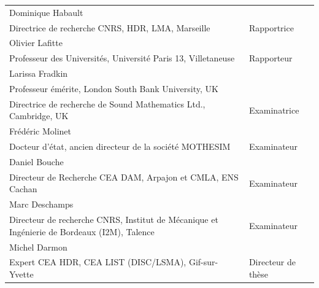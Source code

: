 \documentclass[a4paper]{article}
\newcommand{\jurynameA}{Dominique Habault}
\newcommand{\juryadressA}{Directrice de recherche CNRS, HDR, LMA, Marseille}
\newcommand{\juryroleA}{Rapportrice}
\newcommand{\jurynameB}{Olivier Lafitte}
\newcommand{\juryadressB}{Professeur des Universités, Université Paris 13, Villetaneuse}
\newcommand{\juryroleB}{Rapporteur}
\newcommand{\jurynameC}{Frédéric Molinet}
\newcommand{\juryadressC}{Docteur d'état, ancien directeur de la société MOTHESIM}
\newcommand{\juryroleC}{Examinateur}
\newcommand{\jurynameD}{Daniel Bouche}
\newcommand{\juryadressD}{Directeur de Recherche CEA DAM, Arpajon et CMLA, ENS Cachan}
\newcommand{\juryroleD}{Examinateur}
\newcommand{\jurynameE}{Larissa Fradkin}
\newcommand{\juryadressE}{Professeur émérite, London South Bank University, UK\\ Directrice de recherche de Sound Mathematics Ltd., Cambridge, UK}
\newcommand{\juryroleE}{Examinatrice}
\newcommand{\jurynameF}{Michel Darmon}
\newcommand{\juryadressF}{Expert CEA HDR, CEA LIST (DISC/LSMA), Gif-sur-Yvette}
\newcommand{\juryroleF}{Directeur de thèse}
\newcommand{\jurynameG}{Gilles Lebeau}
\newcommand{\juryadressG}{Professeur, Université de Nice Sophia-Antipolis (Laboratoire J. A. Dieudonné), Nice}
\newcommand{\juryroleG}{Co-directeur de thèse}
\newcommand{\jurynameH}{Loïc De Roumilly}
\newcommand{\juryadressH}{Ingénieur de recherche EDF}
\newcommand{\juryroleH}{Invité}
\newcommand{\jurynameI}{Marc Deschamps}
\newcommand{\juryadressI}{Directeur de recherche CNRS, Institut de Mécanique et Ingénierie de Bordeaux (I2M), Talence}
\newcommand{\juryroleI}{Examinateur}
\begin{document}
\begin{textblock}{10.3}
	\label{jury} 																				%
	\begin{flushleft}
	\begin{tabular}{@{} L{9.5cm} R{4.5cm}}
		\jurynameA  \\ \juryadressA & \juryroleA \\[10pt]
		\jurynameB  \\ \juryadressB & \juryroleB \\[10pt]
		\jurynameE  \\ \juryadressE & \juryroleE \\[10pt]
		\jurynameC  \\ \juryadressC & \juryroleC \\[10pt]
		\jurynameD  \\ \juryadressD & \juryroleD \\[10pt]
		\jurynameI  \\ \juryadressI & \juryroleI \\[10pt]
		\jurynameF  \\ \juryadressF & \juryroleF \\[10pt]
	\end{tabular} 
	\end{flushleft}   
\end{textblock}
\end{document}
